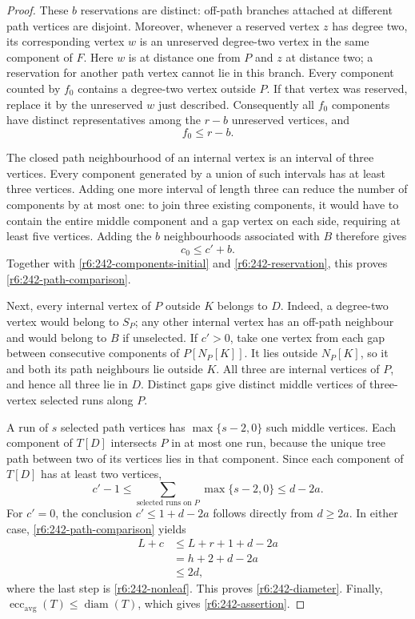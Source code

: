 \documentclass[11pt,a4paper]{article}
\theoremstyle{remark}
\begin{document}
\begin{proof}
These $b$ reservations are distinct: off-path branches attached at
different path vertices are disjoint.  Moreover, whenever a reserved
vertex $z$ has degree two, its corresponding vertex $w$ is an
unreserved degree-two vertex in the same component of $F$.  Here $w$
is at distance one from $P$ and $z$ at distance two; a reservation for
another path vertex cannot lie in this branch.  Every component
counted by $f_0$ contains a degree-two vertex outside $P$.  If that
vertex was reserved, replace it by the unreserved $w$ just described.
Consequently all $f_0$ components have distinct representatives among
the $r-b$ unreserved vertices, and
\begin{equation}
 f_0\le r-b.
 \label{r6:242-reservation}
\end{equation}

The closed path neighbourhood of an internal vertex is an interval of
three vertices.  Every component generated by a union of such
intervals has at least three vertices.  Adding one more interval of
length three can reduce the number of components by at most one:
to join three existing components, it would have to contain the
entire middle component and a gap vertex on each side, requiring at
least five vertices.  Adding the $b$ neighbourhoods associated with
$B$ therefore gives
\[
 c_0\le c'+b.
\]
Together with \eqref{r6:242-components-initial} and
\eqref{r6:242-reservation}, this proves
\eqref{r6:242-path-comparison}.

Next, every internal vertex of $P$ outside $K$ belongs to $D$.
Indeed, a degree-two vertex would belong to $S_P$; any other internal
vertex has an off-path neighbour and would belong to $B$ if unselected.
If $c'>0$, take one vertex from each gap between consecutive
components of $P[N_P[K]]$.  It lies outside $N_P[K]$, so it and both
its path neighbours lie outside $K$.  All three are internal vertices
of $P$, and hence all three lie in $D$.  Distinct gaps give distinct
middle vertices of three-vertex selected runs along $P$.

A run of $s$ selected path vertices has $\max\{s-2,0\}$ such middle
vertices.  Each component of $T[D]$ intersects $P$ in at most one run,
because the unique tree path between two of its vertices lies in that
component.  Since each component of $T[D]$ has at least two vertices,
\[
 c'-1\le\sum_{\text{selected runs on }P}\max\{s-2,0\}
       \le d-2a.
\]
For $c'=0$, the conclusion $c'\le1+d-2a$ follows directly from
$d\ge2a$.  In either case, \eqref{r6:242-path-comparison} yields
\[
 \begin{split}
 L+c&\le L+r+1+d-2a\\
     &=h+2+d-2a\\
     &\le2d,
 \end{split}
\]
where the last step is \eqref{r6:242-nonleaf}.  This proves
\eqref{r6:242-diameter}.  Finally,
$\operatorname{ecc}_{\mathrm{avg}}(T)\le\operatorname{diam}(T)$,
which gives \eqref{r6:242-assertion}.
\end{proof}
\end{document}

